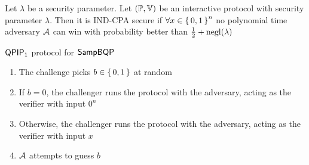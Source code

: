\begin{dfn}
	Let $\lambda$ be a security parameter.
	Let $(\mathbb{P}, \mathbb{V})$ be an interactive protocol with security parameter $\lambda$.
	Then it is IND-CPA secure if $\forall x\in\set{0,1}^n$ no polynomial time adversary $\mathcal{A}$ can win  with probability better than $\frac{1}{2}+\operatorname{negl}(\lambda)$
\end{dfn}

\begin{protocol}{$\operatorname{\mathsf{QPIP}}_1$ protocol for $\operatorname{\mathsf{SampBQP}}$}
	\label{ProtoIndCPA}
	\begin{enumerate}
		\item The challenge picks $b\in\set{0,1}$ at random
		\item If $b=0$, the challenger runs the protocol with the adversary, acting as the verifier with input $0^n$
		\item Otherwise, the challenger runs the protocol with the adversary, acting as the verifier with input $x$
		\item $\mathcal{A}$ attempts to guess $b$
	\end{enumerate}
\end{protocol}
